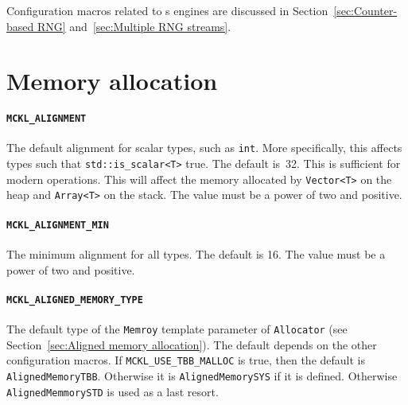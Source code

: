 Configuration macros related to \rng{}s engines are discussed in
Section~\ref{sec:Counter-based RNG} and~\ref{sec:Multiple RNG streams}.

\section{Memory allocation}
\label{sec:Memory allocation}

\paragraph{\texttt{MCKL\_ALIGNMENT}} The default alignment for scalar types,
such as \verb|int|. More specifically, this affects types such that
\verb|std::is_scalar<T>| true. The default is~32. This is sufficient for modern
\simd operations. This will affect the memory allocated by \verb|Vector<T>| on
the heap and \verb|Array<T>| on the stack. The value must be a power of two and
positive.

\paragraph{\texttt{MCKL\_ALIGNMENT\_MIN}} The minimum alignment for all types.
The default is 16. The value must be a power of two and positive.

\paragraph{\texttt{MCKL\_ALIGNED\_MEMORY\_TYPE}} The default type of the
\verb|Memroy| template parameter of \verb|Allocator| (see
Section~\ref{sec:Aligned memory allocation}). The default depends on the other
configuration macros. If \verb|MCKL_USE_TBB_MALLOC| is true, then the
default is \verb|AlignedMemoryTBB|. Otherwise it is \verb|AlignedMemorySYS| if
it is defined. Otherwise \verb|AlignedMemmorySTD| is used as a last resort.

